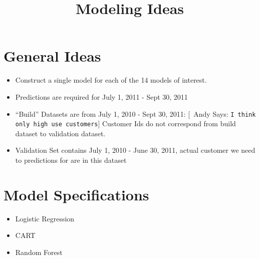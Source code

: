 \documentclass{article}
\begin{document}
  \title{\bf Modeling Ideas}
  
 \maketitle
\newcommand{\ac}[1]{[{\color{red}\ Andy Says: {\tt #1}}]}

\section{General Ideas}

\begin{itemize}
\item Construct a single model for each of the 14 models of interest.
\item Predictions are required for July 1, 2011 - Sept 30, 2011
\item ``Build'' Datasets are from July 1, 2010 - Sept 30, 2011:  \ac{I think only high use customers}  Customer Ids do not correspond from build dataset to validation dataset.
\item Validation Set contains July 1, 2010 - June 30, 2011, actual customer we need to predictions for are in this dataset
\end{itemize}

\section{Model Specifications}
\begin{itemize}
\item Logistic Regression
\item CART
\item Random Forest
\end{itemize}
\end{document}
